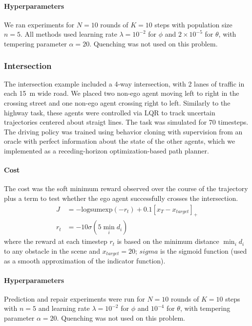 \paragraph{Hyperparameters} We ran experiments for $N=10$ rounds of $K=10$ steps with population size $n=5$. All methods used learning rate $\lambda = 10^{-2}$ for $\phi$ and $2\times10^{-5}$ for $\theta$, with tempering parameter $\alpha = 20$. Quenching was not used on this problem.

\subsubsection{Intersection}

The intersection example included a 4-way intersection, with 2 lanes of traffic in each \SI{15}{m} wide road. We placed two non-ego agent moving left to right in the crossing street and one non-ego agent crossing right to left. Similarly to the highway task, these agents were controlled via LQR to track uncertain trajectories centered about straigt lines. The task was simulated for 70 timesteps. The driving policy was trained using behavior cloning with supervision from an oracle with perfect information about the state of the other agents, which we implemented as a receding-horizon optimization-based path planner.

\paragraph{Cost} The cost was the soft minimum reward observed over the course of the trajectory plus a term to test whether the ego agent successfully crosses the intersection.
\begin{align}
    J   & = -\text{logsumexp}(-r_t) + 0.1 [x_T - x_{target}]_+ \\
    r_t & = -10 \sigma(5 \min_i d_i)
\end{align}
where the reward at each timestep $r_t$ is based on the minimum distance $\min_i d_i$ to any obstacle in the scene and $x_{target} = 20$; $sigma$ is the sigmoid function (used as a smooth approximation of the indicator function).

\paragraph{Hyperparameters} Prediction and repair experiments were run for $N=10$ rounds of $K=10$ steps with $n=5$ and learning rate $\lambda = 10^{-2}$ for $\phi$ and $10^{-4}$ for $\theta$, with tempering parameter $\alpha = 20$. Quenching was not used on this problem.